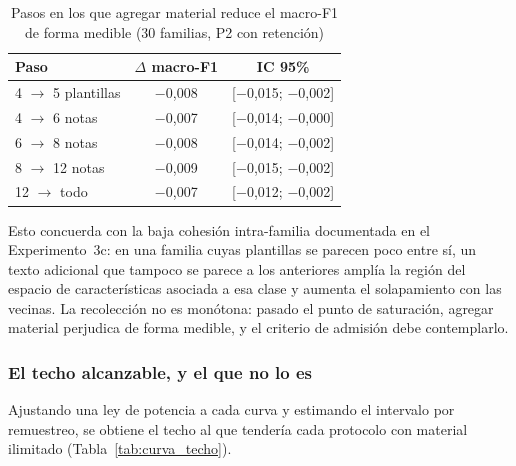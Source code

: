 \begin{table}[ht]
\centering
\caption{Pasos en los que agregar material reduce el macro-F1 de forma medible (30 familias, P2 con retención)}
\label{tab:curva_negativos}
\begin{tabular}{|l|c|c|}
\hline
\textbf{Paso} & \textbf{$\Delta$ macro-F1} & \textbf{IC 95\%} \\
\hline
4 $\rightarrow$ 5 plantillas & $-$0,008 & [$-$0,015; $-$0,002] \\
4 $\rightarrow$ 6 notas & $-$0,007 & [$-$0,014; $-$0,000] \\
6 $\rightarrow$ 8 notas & $-$0,008 & [$-$0,014; $-$0,002] \\
8 $\rightarrow$ 12 notas & $-$0,009 & [$-$0,015; $-$0,002] \\
12 $\rightarrow$ todo & $-$0,007 & [$-$0,012; $-$0,002] \\
\hline
\end{tabular}
\end{table}

Esto concuerda con la baja cohesión intra-familia documentada en el Experimento~3c: en una familia cuyas plantillas se parecen poco entre sí, un texto adicional que tampoco se parece a los anteriores amplía la región del espacio de características asociada a esa clase y aumenta el solapamiento con las vecinas. La recolección no es monótona: pasado el punto de saturación, agregar material perjudica de forma medible, y el criterio de admisión debe contemplarlo.

\subsubsection*{El techo alcanzable, y el que no lo es}

Ajustando una ley de potencia a cada curva y estimando el intervalo por remuestreo, se obtiene el techo al que tendería cada protocolo con material ilimitado (Tabla~\ref{tab:curva_techo}).

\begin{table}[ht]
\centering
\caption{Techo estimado por protocolo y material necesario para alcanzar objetivos de macro-F1 (eje de plantillas, corpus de 149 notas)}
\label{tab:curva_techo}
\end{table}

